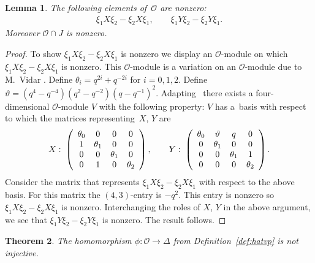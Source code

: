\documentclass[pdftex]{sigma}
\numberwithin{equation}{section}
\newtheorem{Theorem}{Theorem}[section]
\newtheorem{Lemma}[Theorem]{Lemma}
\begin{document}
\begin{Lemma}
\label{lem:nonz}
The following  elements of~$\mathcal O$ are nonzero:
\begin{gather*}
\xi_1 X \xi_2-\xi_2 X \xi_1,
\qquad
\xi_1 Y \xi_2-\xi_2 Y \xi_1.
\end{gather*}
Moreover
${\mathcal O} \cap J$ is nonzero.
\end{Lemma}

\begin{proof}
To show $\xi_1 X \xi_2-\xi_2 X \xi_1$ is nonzero
we display an $\mathcal O$-module
on which
$\xi_1 X \xi_2-\xi_2 X \xi_1$ is nonzero.
This $\mathcal O$-module is a variation on an $\mathcal O$-module
due to M.~Vidar
\cite[Theorem 9.1]{Vidar}.
Def\/ine $\theta_i = q^{2i}+q^{-2i}$
for $i=0,1,2$. Def\/ine $\vartheta = (q^4-q^{-4})(q^2-q^{-2})(q-q^{-1})^2$.
Adapting~\cite[Theorem 9.1]{Vidar}
there exists a four-dimensional $\mathcal O$-module $V$
with the following property: $V$ has a~basis with respect to
which the matrices representing~$X$, $Y$ are
\begin{gather*}
X:\;
\left(
\begin{array}{ c c c c}
\theta_0 & 0 & 0 & 0   \\
1 & \theta_1 & 0 & 0  \\
0 & 0 & \theta_1  & 0 \\
0 & 1 & 0  & \theta_2
\end{array}
\right),
\qquad
Y:\;
\left(
\begin{array}{ c c c c}
\theta_0 & \vartheta & q & 0   \\
0 & \theta_1 & 0 & 0  \\
0 & 0 & \theta_1  & 1 \\
0 & 0 & 0  & \theta_2
\end{array}
\right).
\end{gather*}
Consider the matrix that represents
$\xi_1X\xi_2-\xi_2 X \xi_1 $ with respect to the above basis.
For this matrix the $(4,3)$-entry is $-q^2$.
This entry is nonzero
so
$\xi_1 X \xi_2- \xi_2 X \xi_1$ is nonzero.
Interchanging the roles of $X$, $Y$ in the above argument,
we see that
 $\xi_1 Y \xi_2- \xi_2 Y \xi_1$ is
nonzero.
The result follows.
\end{proof}




\begin{Theorem}
The homomorphism $\phi: {\mathcal O}\to \Delta$ from
Definition~{\rm \ref{def:hatvp}}
is not injective.
\end{Theorem}
\end{document}
